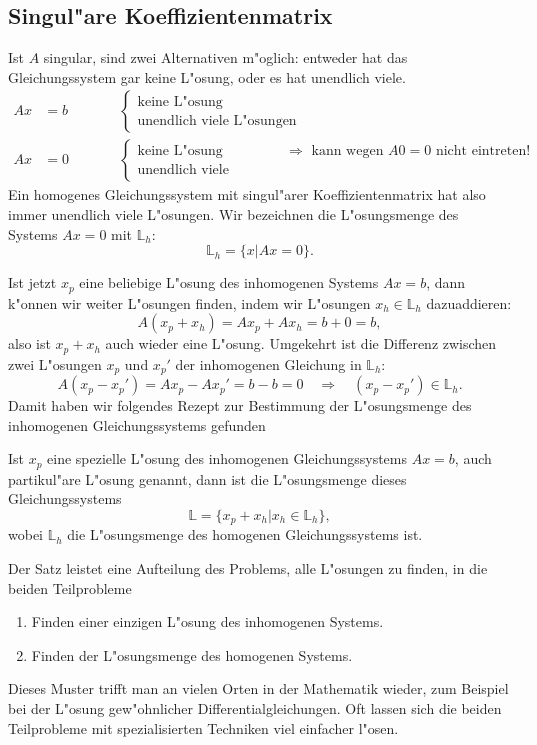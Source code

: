 \subsection{Singul"are Koeffizientenmatrix}
Ist $A$ singular, sind zwei Alternativen m"oglich: entweder hat das
Gleichungssystem gar keine L"osung, oder es hat unendlich viele.
\begin{align*}
Ax&=b&\qquad&\begin{cases}
\text{keine L"osung}\\
\text{unendlich viele L"osungen}
\end{cases}
\\
Ax&=0&\qquad&\begin{cases}
\text{keine L"osung}&\text{$\Rightarrow$ kann wegen $A0=0$ nicht eintreten!}\\
\text{unendlich viele L"osungen}&
\end{cases}
\end{align*}
Ein homogenes Gleichungssystem mit singul"arer Koeffizientenmatrix hat also
immer unendlich viele L"osungen.
Wir bezeichnen die L"osungsmenge des Systems $Ax=0$ mit $\mathbb L_h$:
\[
\mathbb L_h=\{x|Ax=0\}.
\]

Ist jetzt $x_p$ eine beliebige L"osung des inhomogenen Systems $Ax=b$, dann
k"onnen wir weiter L"osungen finden, indem wir L"osungen $x_h\in\mathbb L_h$
dazuaddieren:
\[
A(x_p+x_h)=Ax_p+Ax_h=b+0=b,
\]
also ist $x_p+x_h$ auch wieder eine L"osung.
Umgekehrt ist die Differenz
zwischen zwei L"osungen $x_p$ und $x_p'$ der inhomogenen Gleichung in
$\mathbb L_h$:
\[
A(x_p-x_p')=Ax_p-Ax_p'=b-b=0\quad\Rightarrow\quad (x_p-x_p')\in\mathbb L_h.
\]
Damit haben wir folgendes Rezept zur Bestimmung der L"osungsmenge des
inhomogenen Gleichungssystems gefunden
\begin{satz}
Ist $x_p$ eine spezielle L"osung des inhomogenen Gleichungssystems $Ax=b$,
auch partikul"are L"osung genannt,
dann ist die L"osungsmenge dieses Gleichungssystems 
\[
\mathbb L=\{x_p+x_h|x_h\in\mathbb L_h\},
\]
wobei $\mathbb L_h$ die L"osungsmenge des homogenen Gleichungssystems ist.
\end{satz}
Der Satz leistet eine Aufteilung des Problems, alle L"osungen zu finden,
in die beiden Teilprobleme
\begin{enumerate}
\item Finden einer einzigen L"osung des inhomogenen Systems.
\item Finden der L"osungsmenge des homogenen Systems.
\end{enumerate}
Dieses Muster trifft man an vielen Orten in der Mathematik wieder, zum
Beispiel bei der L"osung gew"ohnlicher Differentialgleichungen.
Oft lassen sich die beiden Teilprobleme mit spezialisierten Techniken
viel einfacher l"osen.

